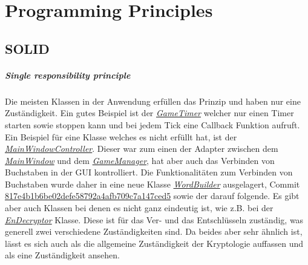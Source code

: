 \chapter{Programming Principles}
\section{SOLID}\label{SOLID}
\paragraph{Single responsibility principle}
Die meisten Klassen in der Anwendung erfüllen das Prinzip und haben nur eine Zuständigkeit. Ein gutes Beispiel ist der \href{https://github.com/EinToni/Wortfinder/blob/main/Wortfinder/GameTimer.cs}{\textit{GameTimer}} welcher nur einen Timer starten sowie stoppen kann und bei jedem Tick eine Callback Funktion aufruft. Ein Beispiel für eine Klasse welches es nicht erfüllt hat, ist der \href{https://github.com/EinToni/Wortfinder/blob/main/Wortfinder/MainWindowController.cs}{\textit{MainWindowController}}. Dieser war zum einen der Adapter zwischen dem \href{https://github.com/EinToni/Wortfinder/blob/main/Wortfinder/MainWindow.xaml.cs}{\textit{MainWindow}} und dem \href{https://github.com/EinToni/Wortfinder/blob/main/Wortfinder/GameManager.cs}{\textit{GameManager}}, hat aber auch das Verbinden von Buchstaben in der GUI kontrolliert. Die Funktionalitäten zum Verbinden von Buchstaben wurde daher in eine neue Klasse \href{https://github.com/EinToni/Wortfinder/blob/main/Wortfinder/WordBuilder.cs}{\textit{WordBuilder}} ausgelagert, Commit \href{https://github.com/EinToni/Wortfinder/commit/817e4b1b6be02defe58792a4afb709c7a147ced5}{817e4b1b6be02defe58792a4afb709c7a147ced5} sowie der darauf folgende. Es gibt aber auch Klassen bei denen es nicht ganz eindeutig ist, wie z.B. bei der \href{https://github.com/EinToni/Wortfinder/blob/main/Wortfinder/EnDecrypter.cs}{\textit{EnDecryptor}} Klasse. Diese ist für das Ver- und das Entschlüsseln zuständig, was generell zwei verschiedene Zuständigkeiten sind. Da beides aber sehr ähnlich ist, lässt es sich auch als die allgemeine Zuständigkeit der Kryptologie auffassen und als eine Zuständigkeit ansehen.



